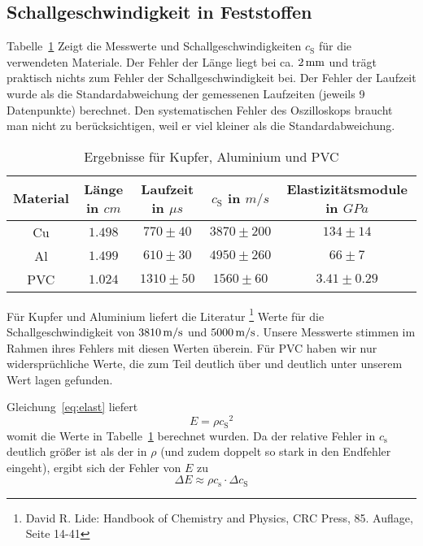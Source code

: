 \subsection{Schallgeschwindigkeit in Feststoffen}
Tabelle~\ref{tb:res} Zeigt die Messwerte und Schallgeschwindigkeiten $c_\mathrm{S}$ für die verwendeten Materiale. Der Fehler der Länge liegt bei ca. $\unit[2]{mm}$ und trägt praktisch nichts zum Fehler der Schallgeschwindigkeit bei. 
Der Fehler der Laufzeit wurde als die Standardabweichung der gemessenen Laufzeiten (jeweils 9 Datenpunkte) berechnet. Den systematischen Fehler des Oszilloskops braucht man nicht zu berücksichtigen, weil er viel kleiner als die Standardabweichung.

\begin{table}
    \centering
\begin{tabular}[h]{c c c c c }
    Material & Länge in $\unit{cm}$ & Laufzeit in $\unit{\mu s}$ & $c_\mathrm{S}$ in $\unit{m/s}$ & Elastizitätsmodule in $\unit{GPa}$\\\hline
    Cu & $1.498$ & $770 \pm 40$ & $3870 \pm 200$ & $134 \pm 14$\\
    Al & $1.499$ & $610 \pm 30$ & $4950 \pm 260$ & $66 \pm 7$\\
    PVC & $1.024$ & $1310 \pm 50$ & $1560 \pm 60$ & $3.41 \pm 0.29$\\
\end{tabular}
\caption{Ergebnisse für Kupfer, Aluminium und PVC}
\label{tb:res}
\end{table}

Für Kupfer und Aluminium liefert die Literatur%
\footnote{David R. Lide: Handbook of Chemistry and Physics, CRC Press, 85. Auflage, Seite 14-41}
Werte für die Schallgeschwindigkeit von $\unit[3810]{m/s}$ und $\unit[5000]{m/s}$. Unsere Messwerte stimmen im Rahmen ihres  Fehlers mit diesen Werten überein. Für PVC haben wir nur widersprüchliche Werte, die zum Teil deutlich über und deutlich unter unserem Wert lagen gefunden.

Gleichung~\ref{eq:elast} liefert
%
\begin{equation*}
    E = \rho {c_\mathrm{S}}^2
\end{equation*}
%
womit die Werte in Tabelle~\ref{tb:res} berechnet wurden. Da der relative Fehler in $c_\mathrm{s}$ deutlich größer ist als der in $\rho$ (und zudem doppelt so stark in den Endfehler eingeht), ergibt sich der Fehler von $E$ zu
\[
    \Delta E \approx \rho c_\mathrm{s} \cdot \Delta c_\mathrm{S}
\]


